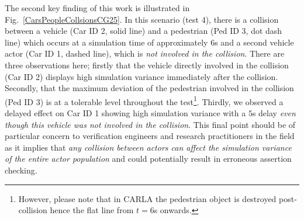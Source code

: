 \documentclass[letterpaper, 10 pt, journal, twoside]{IEEEtran}
\begin{document}
The second key finding of this work is illustrated in Fig.~\ref{CarsPeopleCollsionsCG25}. In this scenario (test 4), there is a collision between a vehicle (Car ID 2, solid line) and a pedestrian (Ped ID 3, dot dash line) which occurs at a simulation time of approximately $6$s and a second vehicle actor (Car ID 1, dashed line), which is \textit{not involved in the collision}. There are three observations here; firstly that the vehicle directly involved in the collision (Car ID 2) displays high simulation variance immediately after the collision.
Secondly, that the maximum deviation of the pedestrian involved in the collision (Ped ID 3) is at a tolerable level throughout the test\footnote{However, please note that in CARLA the pedestrian object is destroyed post-collision hence the flat line from $t=6$s onwards.}. Thirdly, we observed a delayed effect on Car ID 1 showing high simulation variance with a $5$s delay \textit{even though this vehicle was not involved in the collision}. This final point should be of particular concern to verification engineers and research practitioners in the field as it implies that \textit{any collision between actors can affect the simulation variance of the entire actor population} and could potentially result in  erroneous assertion checking.





\end{document}
